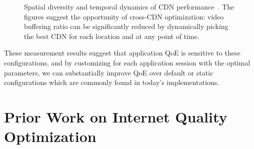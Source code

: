 \begin{figure}[t]
\centering
\captionsetup[subfigure]{justification=centering,farskip=-1pt,captionskip=5pt}
\caption{Spatial diversity and temporal dynamics of CDN 
performance~\cite{sigcomm12}. 
The figures suggest the opportunity of cross-CDN optimization:
video buffering ratio can be significantly reduced by dynamically
picking the best CDN for each location and at any point of time.}
\label{fig:back-cross-cdn}
\end{figure}


These measurement results suggest that application QoE is 
sensitive to these configurations, and by customizing for 
each application session with the optimal parameters, 
we can substantially improve QoE over default or static 
configurations which are commonly found in today's 
implementations.


\section{Prior Work on Internet Quality Optimization}
\label{sec:related:quality}

